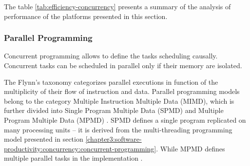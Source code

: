 The table \ref{tab:efficiency-concurrency} presents a summary of the analysis of performance of the platforms presented in this section.












\subsubsection{Parallel Programming} \label{chapter3:software-efficiency:concurrency:parallel-programming}


Concurrent programming allows to define the tasks scheduling causally.
Concurrent tasks can be scheduled in parallel only if their memory are isolated.

The Flynn's taxonomy \cite{Flynn1972} categorizes parallel executions in function of the multiplicity of their flow of instruction and data.
Parallel programming models belong to the category Multiple Instruction Multiple Data (MIMD), which is further divided into Single Program Multiple Data (SPMD) \cite{Auguin1983,Darema1988,Darema2001} and Multiple Program Multiple Data (MPMD) \cite{Chang1997,Chan2004}.
SPMD defines a single program replicated on many processing units \cite{Culler,Johnson1995,K.ManiChandy2005} -- it is derived from the multi-threading programming model presented in section \ref{chapter3:software-productivity:concurrency:concurrent-programming}.
While MPMD defines multiple parallel tasks in the implementation \cite{Grimshaw1991,Foster1995b,Foster1996}.

